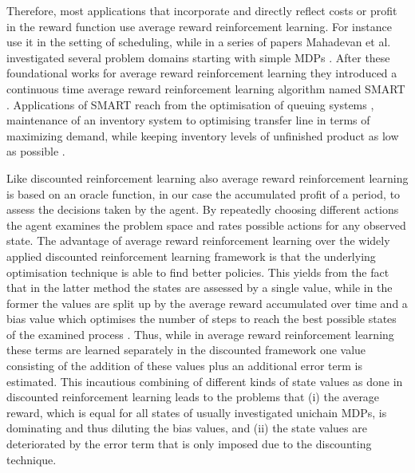 \documentclass[envcountsame]{llncs}
\begin{document}
Therefore, most applications that incorporate and directly reflect costs or profit in the reward
function use average reward reinforcement learning. For instance \cite{aydin2000dynamic} use it in
the setting of scheduling, while in a series of papers Mahadevan et al. investigated several problem
domains starting with simple MDPs
\citep{Mahadevan96_AverageRewardReinforcementLearningFoundationsAlgorithmsAndEmpiricalResults,Mahadevan96_OptimalityCriteriaInReinforcementLearning}.
After these foundational works for average reward reinforcement learning they introduced a
continuous time average reward reinforcement learning algorithm named SMART
\citep{Mahadevan97_SelfimprovingFactorySimulationUsingContinuoustimeAveragerewardReinforcementLearning}.
Applications of SMART reach from the optimisation of queuing systems
\citep{Mahadevan96_AnAveragerewardReinforcementLearningAlgorithmForComputingBiasoptimalPolicies,Mahadevan96_SensitiveDiscountOptimalityUnifyingDiscountedAndAverageRewardReinforcementLearning},
maintenance of an inventory system
\citep{Das99_SolvingSemiMarkovDecisionProblemsUsingAverageRewardReinforcementLearning} to optimising
transfer line in terms of maximizing demand, while keeping inventory levels of unfinished product as
low as possible \citep{Mahadevan98_OptimizingProductionManufacturingUsingReinforcementLearning}.


Like discounted reinforcement learning also average reward reinforcement learning is based on an
oracle function, in our case the accumulated profit of a period, to assess the decisions taken by
the agent. By repeatedly choosing different actions the agent examines the problem space and rates
possible actions for any observed state. The advantage of average reward reinforcement learning over
the widely applied discounted reinforcement learning framework is that the underlying optimisation
technique is able to find better policies. This yields from the fact that in the latter method the
states are assessed by a single value, while in the former the values are split up by the average
reward accumulated over time and a bias value which optimises the number of steps to reach the best
possible states of the examined process
\citep{Howard64,Puterman94,Mahadevan96_AverageRewardReinforcementLearningFoundationsAlgorithmsAndEmpiricalResults}.
Thus, while in average reward reinforcement learning these terms are learned separately in the
discounted framework one value consisting of the addition of these values plus an additional error
term is estimated. This incautious combining of different kinds of state values as done in
discounted reinforcement learning leads to the problems that (i) the average reward, which is equal
for all states of usually investigated unichain MDPs, is dominating and thus diluting the bias
values, and (ii) the state values are deteriorated by the error term that is only imposed due to the
discounting technique.
\end{document}
